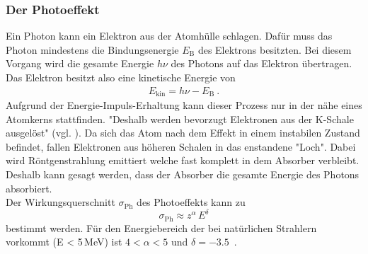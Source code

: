 \subsubsection{Der Photoeffekt}
Ein Photon kann ein Elektron aus der Atomhülle schlagen. Dafür muss das Photon mindestens die Bindungsenergie $E_\text{B}$ des Elektrons besitzten. Bei diesem Vorgang wird die gesamte Energie $h\nu$ des Photons auf das Elektron übertragen. Das Elektron besitzt also eine kinetische Energie von
\begin{align}
	E_\text{kin} = h\nu - E_\text{B} \ .
\end{align}
Aufgrund der Energie-Impuls-Erhaltung kann dieser Prozess nur in der nähe eines Atomkerns stattfinden. "Deshalb werden bevorzugt Elektronen aus der K-Schale ausgelöst" (vgl. \cite[3]{V18}). Da sich das Atom nach dem Effekt in einem instabilen Zustand befindet, fallen Elektronen aus höheren Schalen in das enstandene "Loch". Dabei wird Röntgenstrahlung emittiert welche fast komplett in dem Absorber verbleibt. Deshalb kann gesagt werden, dass der Absorber die gesamte Energie des Photons absorbiert. \\
Der Wirkungsquerschnitt $\sigma_\text{Ph}$ des Photoeffekts kann zu
\begin{equation}
	\sigma_\text{Ph} \approx z^{\alpha}\,E^{\delta}
\end{equation}
bestimmt werden. Für den Energiebereich der bei natürlichen Strahlern vorkommt (E < 5\,MeV) ist $4 < \alpha < 5$ und $\delta = -3.5$\ .



